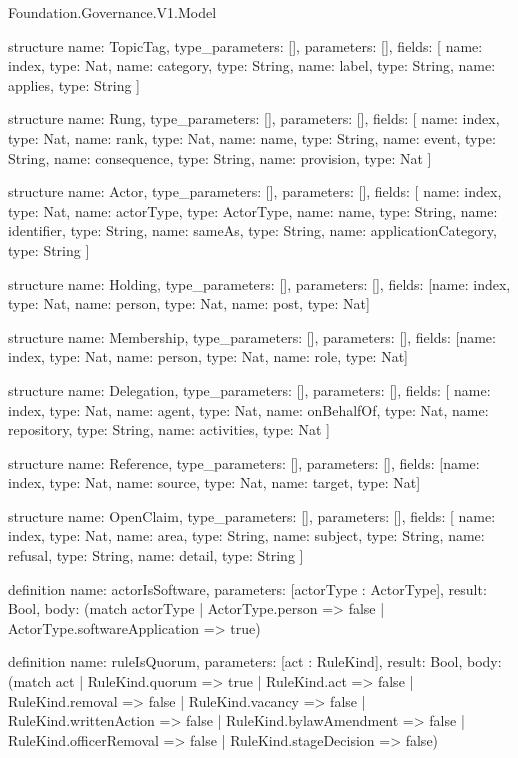 \begin{lexlean}{Foundation.Governance.V1.Model}
\begin{semanticmodule}
structure{
  name: TopicTag,
  type_parameters: [],
  parameters: [],
  fields: [
    {name: index, type: Nat},
    {name: category, type: String},
    {name: label, type: String},
    {name: applies, type: String}
  ]
}

structure{
  name: Rung,
  type_parameters: [],
  parameters: [],
  fields: [
    {name: index, type: Nat},
    {name: rank, type: Nat},
    {name: name, type: String},
    {name: event, type: String},
    {name: consequence, type: String},
    {name: provision, type: Nat}
  ]
}

structure{
  name: Actor,
  type_parameters: [],
  parameters: [],
  fields: [
    {name: index, type: Nat},
    {name: actorType, type: ActorType},
    {name: name, type: String},
    {name: identifier, type: String},
    {name: sameAs, type: String},
    {name: applicationCategory, type: String}
  ]
}

structure{
  name: Holding,
  type_parameters: [],
  parameters: [],
  fields: [{name: index, type: Nat}, {name: person, type: Nat}, {name: post, type: Nat}]
}

structure{
  name: Membership,
  type_parameters: [],
  parameters: [],
  fields: [{name: index, type: Nat}, {name: person, type: Nat}, {name: role, type: Nat}]
}

structure{
  name: Delegation,
  type_parameters: [],
  parameters: [],
  fields: [
    {name: index, type: Nat},
    {name: agent, type: Nat},
    {name: onBehalfOf, type: Nat},
    {name: repository, type: String},
    {name: activities, type: Nat}
  ]
}

structure{
  name: Reference,
  type_parameters: [],
  parameters: [],
  fields: [{name: index, type: Nat}, {name: source, type: Nat}, {name: target, type: Nat}]
}

structure{
  name: OpenClaim,
  type_parameters: [],
  parameters: [],
  fields: [
    {name: index, type: Nat},
    {name: area, type: String},
    {name: subject, type: String},
    {name: refusal, type: String},
    {name: detail, type: String}
  ]
}

definition{
  name: actorIsSoftware,
  parameters: [actorType : ActorType],
  result: Bool,
  body: (match actorType | ActorType.person => false | ActorType.softwareApplication => true)
}

definition{
  name: ruleIsQuorum,
  parameters: [act : RuleKind],
  result: Bool,
  body: (match act
    | RuleKind.quorum => true
    | RuleKind.act => false
    | RuleKind.removal => false
    | RuleKind.vacancy => false
    | RuleKind.writtenAction => false
    | RuleKind.bylawAmendment => false
    | RuleKind.officerRemoval => false
    | RuleKind.stageDecision => false)
}


\end{semanticmodule}
\end{lexlean}
